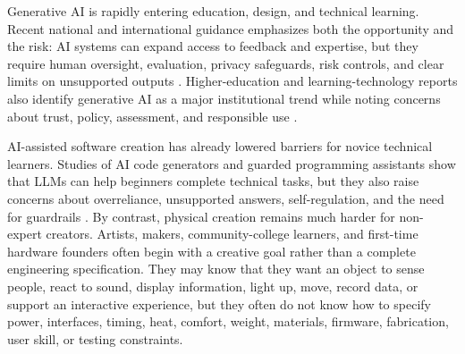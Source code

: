 


Generative AI is rapidly entering education, design, and technical learning. Recent national and international guidance emphasizes both the opportunity and the risk: AI systems can expand access to feedback and expertise, but they require human oversight, evaluation, privacy safeguards, risk controls, and clear limits on unsupported outputs \cite{usdoe2023ai,unesco2023genai,nist2023airmf,nist2024genaiprofile,iso2023ai42001}. Higher-education and learning-technology reports also identify generative AI as a major institutional trend while noting concerns about trust, policy, assessment, and responsible use \cite{educause2024horizon,educause2025horizon,crompton2023highered,mishra2023tpack,wang2023higheredpolicies,ghimire2024governance}.

AI-assisted software creation has already lowered barriers for novice technical learners. Studies of AI code generators and guarded programming assistants show that LLMs can help beginners complete technical tasks, but they also raise concerns about overreliance, unsupported answers, self-regulation, and the need for guardrails \cite{liffiton2023codehelp,kazemitabaar2023aicode,kazemitabaar2023novices,prather2023robots,raihan2024csedreview}. By contrast, physical creation remains much harder for non-expert creators. Artists, makers, community-college learners, and first-time hardware founders often begin with a creative goal rather than a complete engineering specification. They may know that they want an object to sense people, react to sound, display information, light up, move, record data, or support an interactive experience, but they often do not know how to specify power, interfaces, timing, heat, comfort, weight, materials, firmware, fabrication, user skill, or testing constraints.

